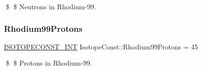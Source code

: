\$ \$ Neutrons in Rhodium-\/99. \mbox{\label{group___isotope_const-_rhodium-_rh99_ga856acb6f92fa83da36623713ac18e226}} 
\subsubsection{\texorpdfstring{Rhodium99\+Protons}{Rhodium99Protons}}
{\footnotesize\ttfamily \mbox{\hyperlink{group___isotope_const-_macros_ga5f18360b3e99483a35c32d789e62621c}{I\+S\+O\+T\+O\+P\+E\+C\+O\+N\+S\+T\+\_\+\+I\+NT}} Isotope\+Const\+::\+Rhodium99\+Protons = 45}

\$ \$ Protons in Rhodium-\/99. 